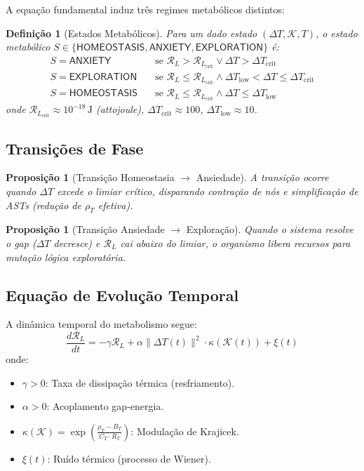 \documentclass[11pt,a4paper]{article}
\newtheorem{proposition}[theorem]{Proposição}
\newtheorem{definition}[theorem]{Definição}
\newcommand{\rhoT}{\rho_T}
\newcommand{\BT}{B_T}
\newcommand{\CT}{C_T}
\newcommand{\RT}{R_T}
\newcommand{\DeltaT}{\Delta T}
\newcommand{\RL}{\mathcal{R}_L}
\begin{document}
A equação fundamental induz três regimes metabólicos distintos:

\begin{definition}[Estados Metabólicos]
Para um dado estado $(\DeltaT, \mathcal{K}, T)$, o estado metabólico $S \in \{\mathsf{HOMEOSTASIS}, \mathsf{ANXIETY}, \mathsf{EXPLORATION}\}$ é:
\begin{align}
    S = \mathsf{ANXIETY} &\quad \text{se } \RL > \RL_{\text{crit}} \lor \DeltaT > \DeltaT_{\text{crit}} \\
    S = \mathsf{EXPLORATION} &\quad \text{se } \RL \le \RL_{\text{crit}} \land \DeltaT_{\text{low}} < \DeltaT \le \DeltaT_{\text{crit}} \\
    S = \mathsf{HOMEOSTASIS} &\quad \text{se } \RL \le \RL_{\text{crit}} \land \DeltaT \le \DeltaT_{\text{low}}
\end{align}
onde $\RL_{\text{crit}} \approx 10^{-18}\,\mathrm{J}$ (attojoule), $\DeltaT_{\text{crit}} \approx 100$, $\DeltaT_{\text{low}} \approx 10$.
\end{definition}

\subsection{Transições de Fase}

\begin{proposition}[Transição Homeostasia $\to$ Ansiedade]
A transição ocorre quando $\DeltaT$ excede o limiar crítico, disparando contração de nós e simplificação de ASTs (redução de $\rhoT$ efetiva).
\end{proposition}

\begin{proposition}[Transição Ansiedade $\to$ Exploração]
Quando o sistema resolve o gap ($\DeltaT$ decresce) e $\RL$ cai abaixo do limiar, o organismo libera recursos para mutação lógica exploratória.
\end{proposition}

\subsection{Equação de Evolução Temporal}

A dinâmica temporal do metabolismo segue:
\begin{equation}
    \frac{d\RL}{dt} = -\gamma \RL + \alpha \|\DeltaT(t)\|^2 \cdot \kappa(\mathcal{K}(t)) + \xi(t)
    \label{eq:dynamics}
\end{equation}
onde:
\begin{itemize}
    \item $\gamma > 0$: Taxa de dissipação térmica (resfriamento).
    \item $\alpha > 0$: Acoplamento gap-energia.
    \item $\kappa(\mathcal{K}) = \exp\left( \frac{\rhoT - \BT}{\CT \cdot \RT} \right)$: Modulação de Krajicek.
    \item $\xi(t)$: Ruído térmico (processo de Wiener).
\end{itemize}
\end{document}
